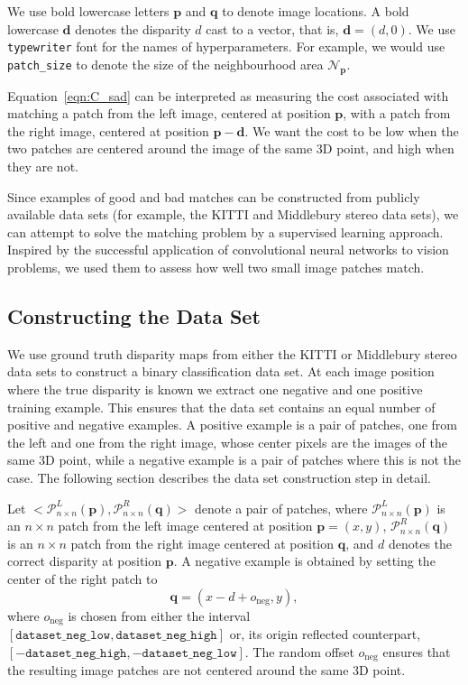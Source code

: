 \documentclass[twoside,11pt]{article}
\begin{document}
We use bold lowercase letters $\mathbf{p}$ and $\mathbf{q}$ to denote image
locations. A bold lowercase $\mathbf{d}$ denotes the disparity $d$ cast to a
vector, that is, $\mathbf{d} = (d, 0)$.  We use \texttt{typewriter} font for
the names of hyperparameters. For example, we would use \texttt{patch\_size} to
denote the size of the neighbourhood area $\mathcal{N}_{\mathbf{p}}$.

Equation~\eqref{eqn:C_sad} can be interpreted as measuring the cost
associated with matching a patch from the left image, centered at position
$\mathbf{p}$, with a patch from the right image, centered at position
$\mathbf{p}-\mathbf{d}$. We want the cost to be low when the two patches are centered
around the image of the same 3D point, and high when they are not. 

Since examples of good and bad matches can be constructed from publicly
available data sets (for example, the KITTI and Middlebury stereo data sets), we
can attempt to solve the matching problem by a supervised learning approach.
Inspired by the successful application of convolutional neural networks to
vision problems, we used them to assess how well two small image patches match.

\subsection{Constructing the Data Set}
\label{sec:dataset}

We use ground truth disparity maps from either the KITTI or Middlebury stereo
data sets to construct a binary classification data set. At each image position
where the true disparity is known we extract one negative and one positive
training example. This ensures that the data set contains an equal number of
positive and negative examples. A positive example is a pair of patches, one
from the left and one from the right image, whose center pixels are the
images of the same 3D point, while a negative example is a pair of patches
where this is not the case. The following section describes the data set
construction step in detail.

Let
$
<\mathcal{P}_{n \times n}^L(\mathbf{p}), \mathcal{P}_{n \times n}^R
(\mathbf{q})>
$
%
denote a pair of patches, where $\mathcal{P}_{n \times n}^L(\mathbf{p})$ is an
$n \times n$ patch from the left image centered at position $\mathbf{p} = (x, y)$,
$\mathcal{P}_{n \times n}^R(\mathbf{q})$ is an $n \times n$ patch from the right image
centered at position $\mathbf{q}$, and $d$ denotes the correct disparity at position
$\mathbf{p}$. A negative example is obtained by setting the center of the right
patch to
%
\begin{equation*}
\mathbf{q} = (x - d + o_{\text{neg}}, y),
\end{equation*}
%
where $o_{\text{neg}}$ is chosen from either the interval
\([\texttt{dataset\_neg\_low}, \texttt{dataset\_neg\_high}]\) or, its origin
reflected counterpart, \([-\texttt{dataset\_neg\_high},
-\texttt{dataset\_neg\_low}]\). The random offset $o_{\text{neg}}$ ensures
that the resulting image patches are not centered around the same 3D point. 
\end{document}

